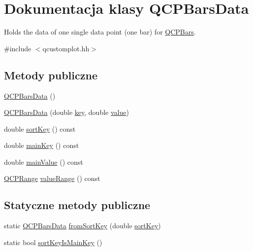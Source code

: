\hypertarget{class_q_c_p_bars_data}{}\section{Dokumentacja klasy Q\+C\+P\+Bars\+Data}
\label{class_q_c_p_bars_data}


Holds the data of one single data point (one bar) for \hyperlink{class_q_c_p_bars}{Q\+C\+P\+Bars}.  




{\ttfamily \#include $<$qcustomplot.\+hh$>$}

\subsection*{Metody publiczne}
\begin{DoxyCompactItemize}
\item 
\hyperlink{class_q_c_p_bars_data_a800794d4c5fea22eeb8bade20798496b}{Q\+C\+P\+Bars\+Data} ()
\item 
\hyperlink{class_q_c_p_bars_data_a4158816a69e2c675885f48afa2b5acc9}{Q\+C\+P\+Bars\+Data} (double \hyperlink{class_q_c_p_bars_data_a09b492217dc03ee1c0348a2f2e6e0a04}{key}, double \hyperlink{class_q_c_p_bars_data_ab636644fb40630f3b1b72f44d65ec072}{value})
\item 
double \hyperlink{class_q_c_p_bars_data_aec71a3f55d0d52192ff9ad85b04ebf8d}{sort\+Key} () const 
\item 
double \hyperlink{class_q_c_p_bars_data_a8d9c33934d75e11d6e205981a4e4b11d}{main\+Key} () const 
\item 
double \hyperlink{class_q_c_p_bars_data_a0ee3c777e5df7d5f5f63fe82539845d5}{main\+Value} () const 
\item 
\hyperlink{class_q_c_p_range}{Q\+C\+P\+Range} \hyperlink{class_q_c_p_bars_data_a87e9dc820e4b306da4dbec1a993bec14}{value\+Range} () const 
\end{DoxyCompactItemize}
\subsection*{Statyczne metody publiczne}
\begin{DoxyCompactItemize}
\item 
static \hyperlink{class_q_c_p_bars_data}{Q\+C\+P\+Bars\+Data} \hyperlink{class_q_c_p_bars_data_ad170d4e90498005ec319338910252ba8}{from\+Sort\+Key} (double \hyperlink{class_q_c_p_bars_data_aec71a3f55d0d52192ff9ad85b04ebf8d}{sort\+Key})
\item 
static bool \hyperlink{class_q_c_p_bars_data_aebaabda335bd4c9f81bd585d16b63aa8}{sort\+Key\+Is\+Main\+Key} ()
\end{DoxyCompactItemize}
